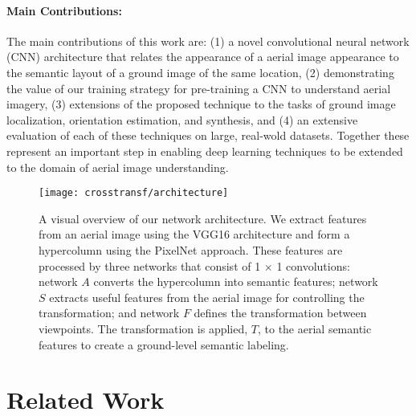 \paragraph{Main Contributions:} The main contributions of this work
are: (1)  a novel convolutional neural network (CNN) architecture that
relates the appearance of a aerial image appearance to the semantic
layout of a ground image of the same location, (2) demonstrating
the value of our training strategy for pre-training a CNN to
understand aerial imagery, (3) extensions of the proposed technique to
the tasks of ground image localization, orientation estimation,
and synthesis, and (4) an extensive evaluation of each of these
techniques on large, real-wold datasets.  Together these represent an
important step in enabling deep learning techniques to be extended to
the domain of aerial image understanding. 

\begin{figure*}
	\centering
	\texttt{[image: crosstransf/architecture]}

  \caption{A visual overview of our network architecture. We extract
    features from an aerial image using the VGG16 architecture and
    form a hypercolumn using the PixelNet approach. These features are
    processed by three networks that consist of 1 $\times$ 1
    convolutions: network $A$ converts the hypercolumn into semantic
    features; network $S$ extracts useful features from the aerial
    image for controlling the transformation; and network $F$ 
    defines the transformation between viewpoints.  The
  transformation is applied, $T$, to the aerial semantic features to
create a ground-level semantic labeling.  }

	\label{fig:architecture_cross}
\end{figure*}

\section{Related Work}

